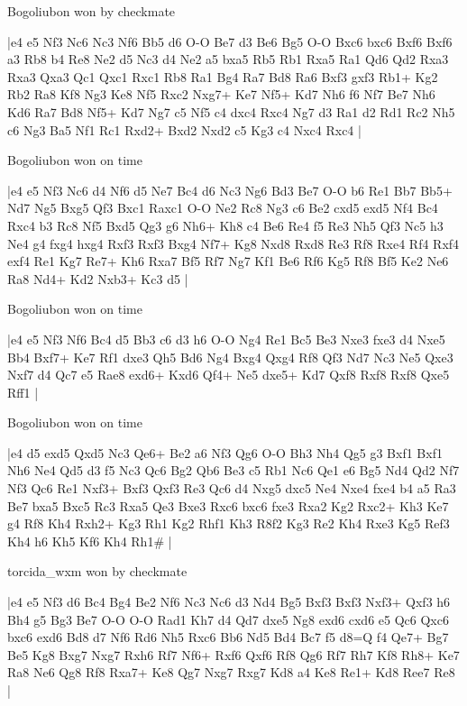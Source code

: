\showboard

Bogoliubon won by checkmate

\makegametitle
|e4 e5 Nf3 Nc6 Nc3 Nf6 Bb5 d6 O-O Be7 d3 Be6 Bg5 O-O Bxc6 bxc6 Bxf6 Bxf6 a3 Rb8 b4 Re8 Ne2 d5 Nc3 d4 Ne2 a5 bxa5 Rb5 Rb1 Rxa5 Ra1 Qd6 Qd2 Rxa3 Rxa3 Qxa3 Qc1 Qxc1 Rxc1 Rb8 Ra1 Bg4 Ra7 Bd8 Ra6 Bxf3 gxf3 Rb1+ Kg2 Rb2 Ra8 Kf8 Ng3 Ke8 Nf5 Rxc2 Nxg7+ Ke7 Nf5+ Kd7 Nh6 f6 Nf7 Be7 Nh6 Kd6 Ra7 Bd8 Nf5+ Kd7 Ng7 c5 Nf5 c4 dxc4 Rxc4 Ng7 d3 Ra1 d2 Rd1 Rc2 Nh5 c6 Ng3 Ba5 Nf1 Rc1 Rxd2+ Bxd2 Nxd2 c5 Kg3 c4 Nxc4 Rxc4  |

\showboard

Bogoliubon won on time

\makegametitle
|e4 e5 Nf3 Nc6 d4 Nf6 d5 Ne7 Bc4 d6 Nc3 Ng6 Bd3 Be7 O-O b6 Re1 Bb7 Bb5+ Nd7 Ng5 Bxg5 Qf3 Bxc1 Raxc1 O-O Ne2 Rc8 Ng3 c6 Be2 cxd5 exd5 Nf4 Bc4 Rxc4 b3 Rc8 Nf5 Bxd5 Qg3 g6 Nh6+ Kh8 c4 Be6 Re4 f5 Re3 Nh5 Qf3 Nc5 h3 Ne4 g4 fxg4 hxg4 Rxf3 Rxf3 Bxg4 Nf7+ Kg8 Nxd8 Rxd8 Re3 Rf8 Rxe4 Rf4 Rxf4 exf4 Re1 Kg7 Re7+ Kh6 Rxa7 Bf5 Rf7 Ng7 Kf1 Be6 Rf6 Kg5 Rf8 Bf5 Ke2 Ne6 Ra8 Nd4+ Kd2 Nxb3+ Kc3 d5  |

\showboard

Bogoliubon won on time

\makegametitle
|e4 e5 Nf3 Nf6 Bc4 d5 Bb3 c6 d3 h6 O-O Ng4 Re1 Bc5 Be3 Nxe3 fxe3 d4 Nxe5 Bb4 Bxf7+ Ke7 Rf1 dxe3 Qh5 Bd6 Ng4 Bxg4 Qxg4 Rf8 Qf3 Nd7 Nc3 Ne5 Qxe3 Nxf7 d4 Qc7 e5 Rae8 exd6+ Kxd6 Qf4+ Ne5 dxe5+ Kd7 Qxf8 Rxf8 Rxf8 Qxe5 Rff1  |

\showboard

Bogoliubon won on time

\makegametitle
|e4 d5 exd5 Qxd5 Nc3 Qe6+ Be2 a6 Nf3 Qg6 O-O Bh3 Nh4 Qg5 g3 Bxf1 Bxf1 Nh6 Ne4 Qd5 d3 f5 Nc3 Qc6 Bg2 Qb6 Be3 c5 Rb1 Nc6 Qe1 e6 Bg5 Nd4 Qd2 Nf7 Nf3 Qc6 Re1 Nxf3+ Bxf3 Qxf3 Re3 Qc6 d4 Nxg5 dxc5 Ne4 Nxe4 fxe4 b4 a5 Ra3 Be7 bxa5 Bxc5 Rc3 Rxa5 Qe3 Bxe3 Rxc6 bxc6 fxe3 Rxa2 Kg2 Rxc2+ Kh3 Ke7 g4 Rf8 Kh4 Rxh2+ Kg3 Rh1 Kg2 Rhf1 Kh3 R8f2 Kg3 Re2 Kh4 Rxe3 Kg5 Ref3 Kh4 h6 Kh5 Kf6 Kh4 Rh1\#  |

\showboard

torcida\_wxm won by checkmate

\makegametitle
|e4 e5 Nf3 d6 Bc4 Bg4 Be2 Nf6 Nc3 Nc6 d3 Nd4 Bg5 Bxf3 Bxf3 Nxf3+ Qxf3 h6 Bh4 g5 Bg3 Be7 O-O O-O Rad1 Kh7 d4 Qd7 dxe5 Ng8 exd6 cxd6 e5 Qc6 Qxc6 bxc6 exd6 Bd8 d7 Nf6 Rd6 Nh5 Rxc6 Bb6 Nd5 Bd4 Bc7 f5 d8=Q f4 Qe7+ Bg7 Be5 Kg8 Bxg7 Nxg7 Rxh6 Rf7 Nf6+ Rxf6 Qxf6 Rf8 Qg6 Rf7 Rh7 Kf8 Rh8+ Ke7 Ra8 Ne6 Qg8 Rf8 Rxa7+ Ke8 Qg7 Nxg7 Rxg7 Kd8 a4 Ke8 Re1+ Kd8 Ree7 Re8  |

